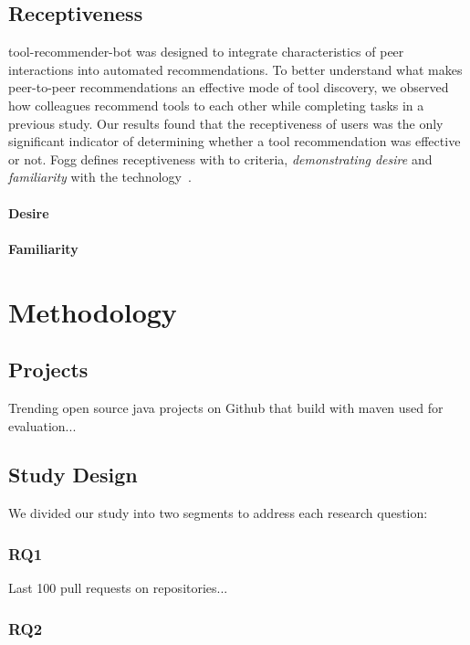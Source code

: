 \documentclass[conference]{IEEEtran}
\newcommand{\tool}{tool-recommender-bot }
\begin{document}
\subsection{Receptiveness}
\tool was designed to integrate characteristics of peer interactions into automated recommendations. To better understand what makes peer-to-peer recommendations an effective mode of tool discovery, we observed how colleagues recommend tools to each other while completing tasks in a previous study. Our results found that the receptiveness of users was the only significant indicator of determining whether a tool recommendation was effective or not. Fogg defines receptiveness with to criteria, \textit{demonstrating desire} and \textit{familiarity} with the technology~\cite{FoggPersuasive}.

\paragraph{Desire}

\paragraph{Familiarity}

\section{Methodology}

\subsection{Projects}

Trending open source java projects on Github that build with maven used for evaluation...

\subsection{Study Design}

We divided our study into two segments to address each research question:

\subsubsection{RQ1}

Last 100 pull requests on repositories...

\subsubsection{RQ2}
\end{document}

